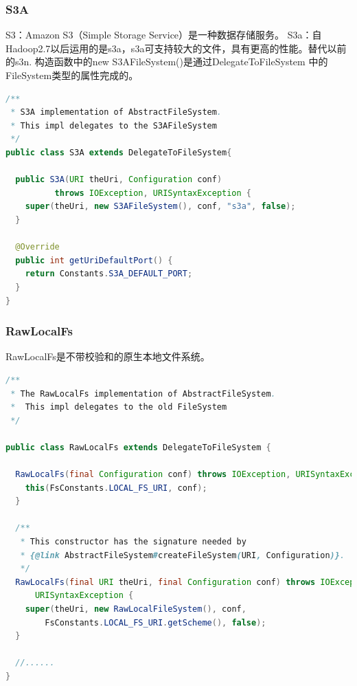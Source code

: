 \subsubsection{S3A}
S3：Amazon S3（Simple Storage Service）是一种数据存储服务。
S3a：自Hadoop2.7以后运用的是s3a，s3a可支持较大的文件，具有更高的性能。替代以前的s3n.
构造函数中的new S3AFileSystem()是通过DelegateToFileSystem 中的FileSystem类型的属性完成的。
\begin{lstlisting}[language=Java]
/**
 * S3A implementation of AbstractFileSystem.
 * This impl delegates to the S3AFileSystem
 */
public class S3A extends DelegateToFileSystem{

  public S3A(URI theUri, Configuration conf)
          throws IOException, URISyntaxException {
    super(theUri, new S3AFileSystem(), conf, "s3a", false);
  }

  @Override
  public int getUriDefaultPort() {
    return Constants.S3A_DEFAULT_PORT;
  }
}
\end{lstlisting}

\subsubsection{RawLocalFs}
RawLocalFs是不带校验和的原生本地文件系统。
\begin{lstlisting}[language=Java]
/**
 * The RawLocalFs implementation of AbstractFileSystem.
 *  This impl delegates to the old FileSystem
 */

public class RawLocalFs extends DelegateToFileSystem {

  RawLocalFs(final Configuration conf) throws IOException, URISyntaxException {
    this(FsConstants.LOCAL_FS_URI, conf);
  }

  /**
   * This constructor has the signature needed by
   * {@link AbstractFileSystem#createFileSystem(URI, Configuration)}.
   */
  RawLocalFs(final URI theUri, final Configuration conf) throws IOException,
      URISyntaxException {
    super(theUri, new RawLocalFileSystem(), conf,
        FsConstants.LOCAL_FS_URI.getScheme(), false);
  }

  //......
}
\end{lstlisting}

